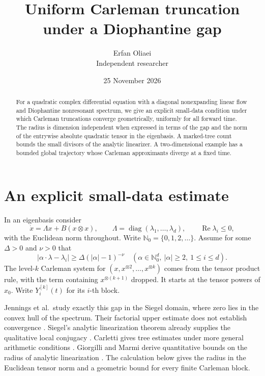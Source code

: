 \documentclass[11pt,a4paper]{article}
\author{Erfan Oliaei\\[2pt]\small Independent researcher}
\date{25 November 2026}
\title{Uniform Carleman truncation under a Diophantine gap}
\begin{document}
\maketitle
\begin{abstract}
For a quadratic complex differential equation with a diagonal nonexpanding linear flow and Diophantine nonresonant spectrum, we give an explicit small-data condition under which Carleman truncations converge geometrically, uniformly for all forward time. The radius is dimension independent when expressed in terms of the gap and the norm of the entrywise absolute quadratic tensor in the eigenbasis. A marked-tree count bounds the small divisors of the analytic linearizer. A two-dimensional example has a bounded global trajectory whose Carleman approximants diverge at a fixed time.
\end{abstract}

\section{An explicit small-data estimate}
In an eigenbasis consider
\begin{equation}\label{eq:ode}
 \dot x=\Lambda x+B(x\otimes x),\qquad
 \Lambda=\operatorname{diag}(\lambda_1,\ldots,\lambda_d),\qquad
 \operatorname{Re}\lambda_i\le0,
\end{equation}
with the Euclidean norm throughout. Write \(\mathbb{N}_0=\{0,1,2,\ldots\}\). Assume for some \(\Delta>0\) and \(\nu>0\) that
\begin{equation}\label{eq:gap}
 |\alpha\cdot\lambda-\lambda_i|\ge\Delta(|\alpha|-1)^{-\nu}
 \quad(\alpha\in\mathbb{N}_0^d,\ |\alpha|\ge2,\ 1\le i\le d).
\end{equation}
The level-\(k\) Carleman system for \((x,x^{\otimes2},\ldots,x^{\otimes k})\) comes from the tensor product rule, with the term containing \(x^{\otimes(k+1)}\) dropped. It starts at the tensor powers of \(x_0\). Write \(Y_i^{[k]}(t)\) for its \(i\)-th block.

Jennings et al.\ study exactly this gap in the Siegel domain, where zero lies in the convex hull of the spectrum. Their factorial upper estimate does not establish convergence \cite[Sec.~5.4.2 and App.~I]{jennings}. Siegel's analytic linearization theorem already supplies the qualitative local conjugacy \cite{siegel}. Carletti gives tree estimates under more general arithmetic conditions \cite[Lemma~5.4]{carletti}. Giorgilli and Marmi derive quantitative bounds on the radius of analytic linearization \cite{gm}. The calculation below gives the radius in the Euclidean tensor norm and a geometric bound for every finite Carleman block.
\end{document}
